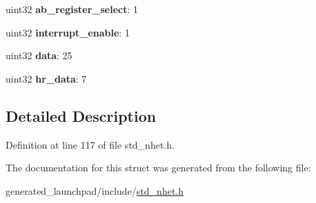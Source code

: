 \begin{DoxyCompactItemize}
uint32 {\bfseries ab\+\_\+register\+\_\+select}\+: 1
\item 
\mbox{\label{structecmp__format_a45cb694474c096f7a7620c767efbbfc1}} 
uint32 {\bfseries interrupt\+\_\+enable}\+: 1
\item 
\mbox{\label{structecmp__format_a23a09a402e0918b104d542388ff8bfbe}} 
uint32 {\bfseries data}\+: 25
\item 
\mbox{\label{structecmp__format_aa1a983aa97e63b8324ebe83e2739cf5c}} 
uint32 {\bfseries hr\+\_\+data}\+: 7
\end{DoxyCompactItemize}


\subsection{Detailed Description}


Definition at line 117 of file std\+\_\+nhet.\+h.



The documentation for this struct was generated from the following file\+:\begin{DoxyCompactItemize}
\item 
generated\+\_\+launchpad/include/\mbox{\hyperlink{std__nhet_8h}{std\+\_\+nhet.\+h}}\end{DoxyCompactItemize}
